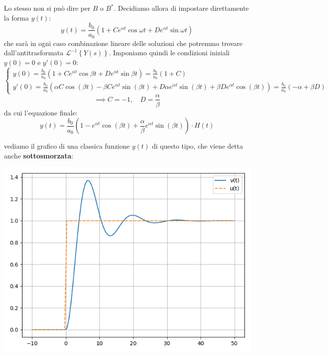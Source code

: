 \documentclass[a4paper,11pt]{article}
\begin{document}
Lo stesso non si può dire per $B$ o $B^*$.
Decidiamo allora di impostare direttamente la forma $y(t)$:
$$
y(t) = \frac{b_0}{a_0} \left( 1 + C e^{\alpha t} \cos{\omega t} + D e^{\alpha t} \sin{\omega t} \right)
$$
che sarà in ogni caso combinazione lineare delle soluzioni che potremmo trovare dall'antitrasformata $\mathcal{L}^{-1} \left\{ Y(s) \right\}$.
Imponiamo quindi le condizioni iniziali $y(0) = 0$ e $y'(0) = 0$:
\[
	\begin{cases}
		y(0) =  \frac{b_0}{a_0} \left( 1 + C e^{\alpha t} \cos{\beta t} + D e^{\alpha t} \sin{\beta t} \right)
		= \frac{b_0}{a_0} \left( 1 + C \right) \\
		y'(0) = \frac{b_0}{a_0} \left( \alpha C \cos(\beta t) - \beta C e^{\alpha t} \sin(\beta t) + D \alpha e^{\alpha t}\sin(\beta t) + \beta D e^{\alpha t} \cos(\beta t) \right)
		= \frac{b_0}{a_0} \left( -\alpha + \beta D \right)
	\end{cases}
\]
$$
	\implies C = -1, \quad D = \frac{\alpha}{\beta}
$$
da cui l'equazione finale:
$$
y\left(t\right)=\frac{b_{0}}{a_{0}}\left(1-e^{\alpha t}\cos\left(\beta t\right)+\frac{\alpha}{\beta}e^{\alpha t}\sin\left(\beta t\right)\right) \cdot H(t)
$$

\noindent
\begin{minipage}{\textwidth}
vediamo il grafico di una classica funzione $y(t)$ di questo tipo, che viene detta anche \textbf{sottosmorzata}:
\begin{center}
	\includegraphics[scale=0.66]{../figures/second_degree_underdamped.png}
\end{center}
\end{minipage}
\end{document}
